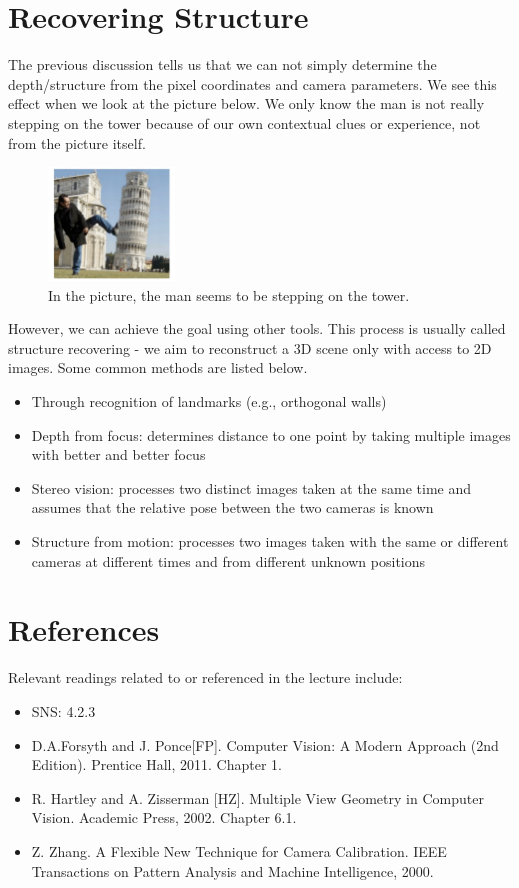 \documentclass[]{article}
\begin{document}
\section{Recovering Structure}
The previous discussion tells us that we can not simply determine the depth/structure from the pixel coordinates and camera parameters. We see this effect when we look at the picture below. We only know the man is not really stepping on the tower because of our own contextual clues or experience, not from the picture itself.

\begin{figure}[H]
\includegraphics[width=0.3\textwidth]{stepping_on_tower.png}
\centering
\caption{In the picture, the man seems to be stepping on the tower.}
\label{fig:stepping_on_tower}
\end{figure}

However, we can achieve the goal using other tools. This process is usually called structure recovering - we aim to reconstruct a 3D scene only with access to 2D images. Some common methods are listed below.

\begin{itemize}
  \item Through	recognition of landmarks (e.g., orthogonal walls)
  \item Depth from focus: determines distance to one point by taking multiple images with better and better focus
  \item Stereo vision: processes two distinct images taken at the same time and assumes that the relative pose between the two cameras is known
  \item Structure from motion: processes two images taken with the same or different cameras at different times and from different unknown positions
\end{itemize}


\section{References}
Relevant readings related to or referenced in the lecture include:
\begin{itemize}
  \item SNS: 4.2.3
  \item D.A.Forsyth	and	J.	Ponce[FP]. Computer Vision:	A	Modern	Approach	(2nd
Edition).	Prentice	Hall,	2011.	Chapter	1.
  \item R.	Hartley	and	A.	Zisserman	[HZ].	Multiple	View	Geometry	in	Computer
Vision.	Academic	Press,	2002.	Chapter	6.1.
  \item Z.	Zhang.	A	Flexible	New	Technique	for	Camera	Calibration. IEEE	Transactions
on	Pattern	Analysis	and	Machine	Intelligence,	2000.
\end{itemize}
\end{document}

